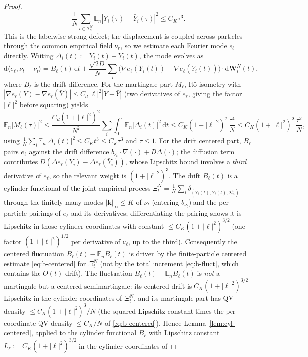 \documentclass[a4paper,fleqn]{cas-sc}
\theoremstyle{definition}
\theoremstyle{remark}
\begin{document}
\begin{proof}
\[
\frac1N\sum_{i\in\mathcal I^N_n}\mathbb E_n|Y_i(\tau)-\bar Y_i(\tau)|^2\le C_K\tau^3.
\]
This is the labelwise strong defect; the displacement is coupled across particles
through the common empirical field $\nu_r$, so we estimate each Fourier mode
$e_\ell$ directly. Writing $\Delta_i(t):=Y_i(t)-\bar Y_i(t)$, the mode evolves as
\[
\mathrm d\langle e_\ell,\nu_t-\bar\nu_t\rangle
=B_\ell(t)\,\mathrm dt
+\frac{\sqrt{2D}}N\sum_{i}\bigl(\nabla e_\ell(Y_i(t))-\nabla e_\ell(\bar Y_i(t))\bigr)\!\cdot\!\mathrm d\mathbf W^N_i(t),
\]
where $B_\ell$ is the drift difference. For the martingale part $M_\ell$, It\^o
isometry with $|\nabla e_\ell(Y)-\nabla e_\ell(\bar Y)|\le C_d|\ell|^2|Y-\bar Y|$
(two derivatives of $e_\ell$, giving the factor $|\ell|^2$ before squaring) yields
\[
\mathbb E_n|M_\ell(\tau)|^2
\le\frac{C_d(1+|\ell|^2)^2}{N^2}\sum_i\int_0^\tau\mathbb E_n|\Delta_i(t)|^2\,\mathrm dt
\le C_K(1+|\ell|^2)^2\,\frac{\tau^4}{N}
\le C_K(1+|\ell|^2)^2\,\frac{\tau^3}{N},
\]
using $\frac1N\sum_i\mathbb E_n|\Delta_i(t)|^2\le C_Kt^3\le C_K\tau^3$ and $\tau\le1$.
For the drift centered part, $B_\ell$ pairs $e_\ell$ against the drift
difference $b_{\nu_t}\!\cdot\!\nabla(\cdot)+D\Delta(\cdot)$; the diffusion term
contributes $D(\Delta e_\ell(Y_i)-\Delta e_\ell(\bar Y_i))$, whose Lipschitz
bound involves a \emph{third} derivative of $e_\ell$, so the relevant weight is
$(1+|\ell|^2)^3$. The drift $B_\ell(t)$ is a cylinder functional of the
joint empirical process
$\Xi^N_t=\frac1N\sum_i\delta_{(Y_i(t),\bar Y_i(t),\mathbf X^i_n)}$ through the
finitely many modes $|\mathbf k|_\infty\le K$ of $\nu_t$ (entering $b_{\nu_t}$) and
the per-particle pairings of $e_\ell$ and its derivatives; differentiating the
pairing shows it is Lipschitz in those cylinder coordinates with constant
$\le C_K(1+|\ell|^2)^{3/2}$ (one factor $(1+|\ell|^2)^{1/2}$ per derivative of
$e_\ell$, up to the third). Consequently the centered fluctuation $B_\ell(t)-\mathbb E_nB_\ell(t)$ is driven by the
finite-particle centered estimate \eqref{eq:b-centered} for $\Xi^N_t$ (not by the total
increment \eqref{eq:b-fluct}, which contains the $O(t)$ drift). The fluctuation
$B_\ell(t)-\mathbb E_nB_\ell(t)$ is \emph{not} a martingale but a centered semimartingale:
its centered drift is $C_K(1+|\ell|^2)^{3/2}$-Lipschitz in the cylinder coordinates of
$\Xi^N_t$, and its martingale part has QV density $\le C_K(1+|\ell|^2)^3/N$ (the squared
Lipschitz constant times the per-coordinate QV density $\le C_K/N$ of \eqref{eq:b-centered}).
Hence Lemma~\ref{lem:cyl-centered}, applied to the cylinder functional $B_\ell$ with
Lipschitz constant $L_\ell:=C_K(1+|\ell|^2)^{3/2}$ in the cylinder coordinates of

\end{proof}
\end{document}
